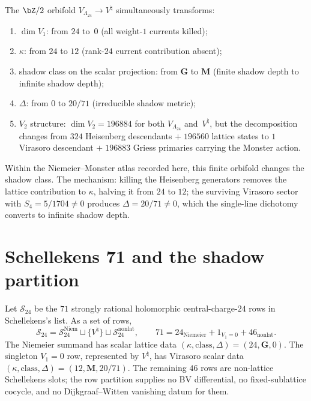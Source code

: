 \begin{remark}%
\label{rem:moonshine-orbifold-class-transition}%
%
The $\bZ/2$ orbifold
$V_{\Lambda_{24}} \longrightarrow V^\natural$
simultaneously transforms:
\begin{enumerate}[label=\textup{(\roman*)}]
\item $\dim V_1$: from $24$ to~$0$
 (all weight-$1$ currents killed);
\item $\kappa$: from $24$ to $12$
 (rank-$24$ current contribution absent);
\item shadow class on the scalar projection: from $\mathbf{G}$ to
 $\mathbf{M}$ (finite shadow depth to infinite shadow depth);
\item $\Delta$: from $0$ to $20/71$
 (irreducible shadow metric);
\item $V_2$ structure: $\dim V_2 = 196884$ for both
 $V_{\Lambda_{24}}$ and~$V^\natural$, but the
 decomposition changes from $324$ Heisenberg descendants
 $+\;196560$ lattice states to $1$ Virasoro descendant
 $+\;196883$ Griess primaries carrying the Monster action.
\end{enumerate}
Within the Niemeier--Monster atlas recorded here, this finite
orbifold changes the shadow class. The mechanism:
killing the Heisenberg generators removes the lattice
contribution to $\kappa$, halving it from $24$ to $12$;
the surviving Virasoro sector with
$S_4 = 5/1704 \neq 0$ produces
$\Delta = 20/71 \neq 0$, which the single-line dichotomy
converts to infinite shadow depth.
\end{remark}

\section{Schellekens 71 and the shadow partition}
\label{sec:schellekens-three-mechanism}

\begin{theorem}[Schellekens structured decomposition at
\texorpdfstring{$c=24$}{c=24}]
\label{thm:schellekens-three-mechanism}
\ClaimStatusConditional
Let $\mathcal{S}_{24}$ be the $71$ strongly rational holomorphic
central-charge-$24$ rows in Schellekens's list. As a set of rows,
\[
\mathcal{S}_{24}
= \mathcal{S}_{24}^{\mathrm{Niem}}
\sqcup \{V^\natural\}
\sqcup \mathcal{S}_{24}^{\mathrm{nonlat}},
\qquad
71 = 24_{\mathrm{Niemeier}} + 1_{V_1=0} + 46_{\mathrm{nonlat}}.
\]
The Niemeier summand has scalar lattice data
$(\kappa,\mathrm{class},\Delta)=(24,\mathbf{G},0)$. The singleton
$V_1=0$ row, represented by $V^\natural$, has Virasoro scalar data
$(\kappa,\mathrm{class},\Delta)=(12,\mathbf{M},20/71)$.
The remaining $46$ rows are non-lattice Schellekens slots; the row
partition supplies no BV differential, no fixed-sublattice cocycle,
and no Dijkgraaf--Witten vanishing datum for them.
\end{theorem}

